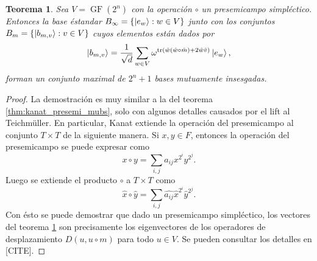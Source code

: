 \documentclass[a4paper]{report}
\DeclareMathOperator{\tr}{tr}
\DeclareMathOperator{\GF}{GF}
\newtheorem{theorem}{Teorema}
\begin{document}
  \begin{theorem}
    \label{thm:kanat_even}
    Sea $V = \GF(2^{n})$ con la operación $\circ$ un
    presemicampo simpléctico. Entonces la base éstandar
    $B_\infty = \{\ket{e_w} : w \in V\}$ junto con los
    conjuntos $B_m = \{\ket{b_{m,v}} : v \in V\}$ cuyos
    elementos están dados por
    \begin{equation}
      \ket{b_{m,v}}
      = \frac{1}{\sqrt{d}} \sum_{w \in V}^{}
      \omega^{\tr\left(
        \hat w ( \hat w \circ \hat m ) + 2 \hat w \hat v
      \right) } \ket{e_w},
    \end{equation}
    forman un conjunto maximal de $2^{n} + 1$ bases
    mutuamente insesgadas.
  \end{theorem}
  \begin{proof}
    La demostración es muy similar a la del teorema
    \ref{thm:kanat_presemi_mubs}, solo con algunos detalles
    causados por el lift al Teichmüller. En particular,
    Kanat extiende la operación del presemicampo al conjunto
    $T \times T$ de la siguiente manera. Si $x, y \in F$,
    entonces la operación del presemicampo se puede expresar
    como
    \[
      x \circ y
      = \sum_{i,j}^{} a_{ij} x^{2^{i}} y^{2^{j}}.
    \] 
    Luego se extiende el producto $\circ$ a $T \times T$
    como
    \[
      \hat x \circ \hat y
      = \sum_{i,j}^{} \widehat{a_{ij}} \hat{x}^{2^{i}}
      \hat{y}^{2^{j}}. 
    \] 
    Con ésto se puede demostrar que dado un presemicampo
    simpléctico, los vectores del teorema
    \ref{thm:kanat_even} son precisamente los eigenvectores
    de los operadores de desplazamiento $D(u,u\circ m)$ para
    todo $u \in V$.  Se pueden consultar los detalles en
    [CITE].

\end{proof}
\end{document}
